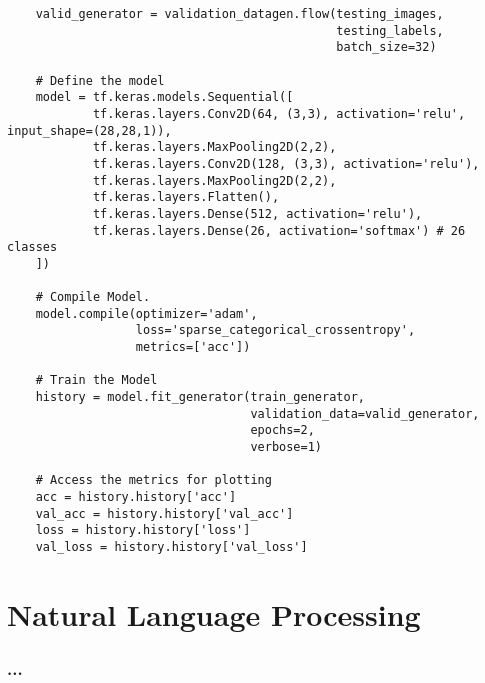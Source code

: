 \documentclass[11pt, a4paper]{article}
\begin{document}
\begin{spacing}{1.1}
\begin{lstlisting}
	valid_generator = validation_datagen.flow(testing_images,
	                                          testing_labels,
	                                          batch_size=32)
	
	# Define the model
	model = tf.keras.models.Sequential([
			tf.keras.layers.Conv2D(64, (3,3), activation='relu', input_shape=(28,28,1)),
			tf.keras.layers.MaxPooling2D(2,2),
			tf.keras.layers.Conv2D(128, (3,3), activation='relu'),
			tf.keras.layers.MaxPooling2D(2,2),
			tf.keras.layers.Flatten(),
			tf.keras.layers.Dense(512, activation='relu'),
			tf.keras.layers.Dense(26, activation='softmax') # 26 classes
	])
	
	# Compile Model. 
	model.compile(optimizer='adam',
	              loss='sparse_categorical_crossentropy',
	              metrics=['acc'])
	          
	# Train the Model
	history = model.fit_generator(train_generator,
	                              validation_data=valid_generator,
	                              epochs=2,
	                              verbose=1)          
	
	# Access the metrics for plotting
	acc = history.history['acc']
	val_acc = history.history['val_acc']
	loss = history.history['loss']
	val_loss = history.history['val_loss'] \end{lstlisting} \newpage

	\section{Natural Language Processing}
	\subsubsection{...}
	
	
	
	
	
	
	
	
	
	
	
	
	
	
	
	
	
	
	
	
	
	
	
	
	
	
	
\end{spacing}
\end{document}
